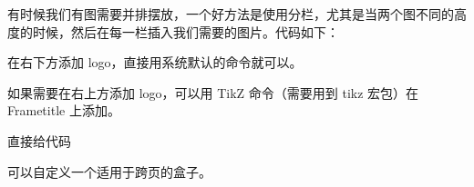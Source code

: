 
有时候我们有图需要并排摆放，一个好方法是使用分栏，尤其是当两个图不同的高度的时候，然后在每一栏插入我们需要的图片。代码如下：

\begin{texinlist}
\end{texinlist}



在右下方添加 logo，直接用系统默认的命令就可以。

\begin{texinlist}
\end{texinlist}

如果需要在右上方添加 logo，可以用 TikZ 命令（需要用到 tikz 宏包）在
Frametitle 上添加。

\begin{texinlist}
\end{texinlist}



直接给代码

\begin{texinlist}
\newenvironment{question}
{\begin{frame}[environment=question,fragile]
 \begin{theorem}
}
{\end{theorem}
 \end{frame}
}
\end{texinlist}


可以自定义一个适用于跨页的盒子。

